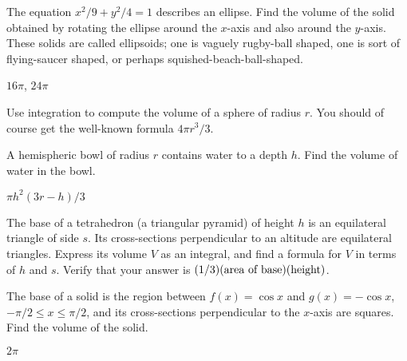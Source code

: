\begin{exercises}
\begin{exercise} The equation $x^2/9+y^2/4=1$ describes an ellipse.  Find the
volume of the solid obtained by rotating the ellipse around the
$x$-axis and also around the $y$-axis. These solids are
called {\dfont ellipsoids\/}; one is vaguely rugby-ball shaped, one is
sort of flying-saucer shaped, or perhaps squished-beach-ball-shaped.
\begin{answer} $16\pi$, $24\pi$
\end{answer}\end{exercise}



\begin{exercise} Use integration to compute the volume of a sphere of radius
$r$. You should of course get the well-known formula $4\pi r^3/3$.
\end{exercise}

\begin{exercise}
A hemispheric bowl of radius $r$ contains water to a depth $h$.  Find
the volume of water in the bowl.
\begin{answer} $\pi h^2(3r-h)/3$
\end{answer}\end{exercise}

\begin{exercise} The base of a tetrahedron (a triangular pyramid) of height $h$
is an equilateral triangle of side $s$.  Its cross-sections
perpendicular to an altitude are equilateral triangles.  Express its
volume $V$ as an integral, and find a formula for $V$ in terms of $h$
and $s$. Verify that your answer is $(1/3)(\hbox{area of
  base})(\hbox{height})$. 
\end{exercise}

\begin{exercise}
The base of a solid is the region between $f(x)=\cos x$ and
$g(x)=-\cos x$, $-\pi/2\le x\le\pi/2$,
and its cross-sections perpendicular to the $x$-axis 
are squares.
Find the volume of the solid.
\begin{answer} $2\pi$
\end{answer}\end{exercise}

\end{exercises}

















